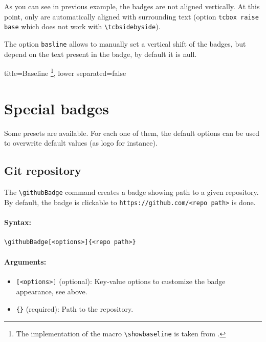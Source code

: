 As you can see in previous example, the badges are not aligned vertically.
At this point, only  are automatically aligned with surrounding text (option \texttt{tcbox raise base} which does not work with \texttt{\textbackslash tcbsidebyside}).

The option \texttt{basline} allows to manually set a vertical shift of the badges, but depend on the text present in the badge, by default it is null.

\begin{tcblisting}{
    title={Baseline%
        \footnote{The implementation of the macro \texttt{\textbackslash showbaseline} is taken from .}},
    lower separated=false}
\end{tcblisting}




\section{Special badges}
\label{sec:special-badges}


Some presets are available.
For each one of them, the default options can be used to overwrite default values (as logo for instance).

\subsection{Git repository}

The \texttt{\textbackslash githubBadge} command creates a badge showing path to a given repository.
By default, the badge is clickable to \texttt{https://github.com/<repo path>} is done.


\paragraph{Syntax:}
\begin{verbatim}
\githubBadge[<options>]{<repo path>}
\end{verbatim}

\paragraph{Arguments:}
\begin{itemize}
    \item \texttt{[<options>]} (optional): Key-value options to customize the badge appearance, see above.
    \item \texttt{\{<repo path>\}} (required): Path to the repository.
\end{itemize}

